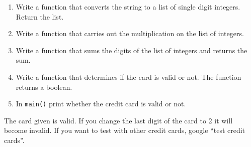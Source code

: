 \documentclass[12pt]{article}
\begin{document}
\begin{enumerate}
\begin{enumerate}
  \item Write a function that converts the string to a list of single digit integers. Return the list. 

  \item Write a function that carries out the multiplication on the list of integers.

  \item Write a function that sums the digits of the list of integers and returns the sum.

  \item Write a function that determines if the card is valid or not. The function returns a boolean.

  \item In \texttt{main()} print whether the credit card is valid or not.

 
\end{enumerate}
The card given is valid. If you change the last digit of the card to 2 it will
become invalid. If you want to test with other credit cards, google
``test credit cards''. 


\end{enumerate}
\end{document}
